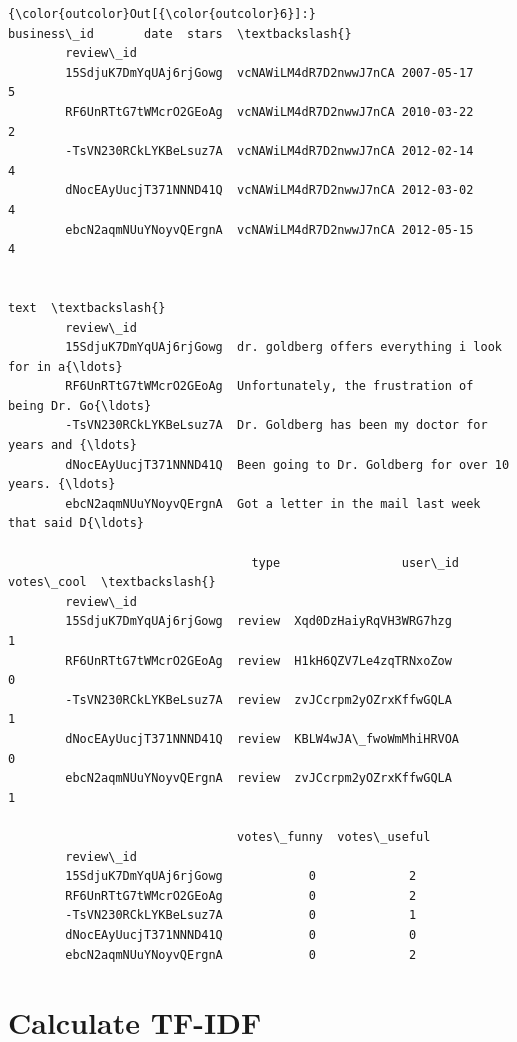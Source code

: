 \documentclass[11pt]{article}
\begin{document}
\begin{Verbatim}[commandchars=\\\{\}]
{\color{outcolor}Out[{\color{outcolor}6}]:}                                    business\_id       date  stars  \textbackslash{}
        review\_id                                                          
        15SdjuK7DmYqUAj6rjGowg  vcNAWiLM4dR7D2nwwJ7nCA 2007-05-17      5   
        RF6UnRTtG7tWMcrO2GEoAg  vcNAWiLM4dR7D2nwwJ7nCA 2010-03-22      2   
        -TsVN230RCkLYKBeLsuz7A  vcNAWiLM4dR7D2nwwJ7nCA 2012-02-14      4   
        dNocEAyUucjT371NNND41Q  vcNAWiLM4dR7D2nwwJ7nCA 2012-03-02      4   
        ebcN2aqmNUuYNoyvQErgnA  vcNAWiLM4dR7D2nwwJ7nCA 2012-05-15      4   
        
                                                                             text  \textbackslash{}
        review\_id                                                                   
        15SdjuK7DmYqUAj6rjGowg  dr. goldberg offers everything i look for in a{\ldots}   
        RF6UnRTtG7tWMcrO2GEoAg  Unfortunately, the frustration of being Dr. Go{\ldots}   
        -TsVN230RCkLYKBeLsuz7A  Dr. Goldberg has been my doctor for years and {\ldots}   
        dNocEAyUucjT371NNND41Q  Been going to Dr. Goldberg for over 10 years. {\ldots}   
        ebcN2aqmNUuYNoyvQErgnA  Got a letter in the mail last week that said D{\ldots}   
        
                                  type                 user\_id  votes\_cool  \textbackslash{}
        review\_id                                                            
        15SdjuK7DmYqUAj6rjGowg  review  Xqd0DzHaiyRqVH3WRG7hzg           1   
        RF6UnRTtG7tWMcrO2GEoAg  review  H1kH6QZV7Le4zqTRNxoZow           0   
        -TsVN230RCkLYKBeLsuz7A  review  zvJCcrpm2yOZrxKffwGQLA           1   
        dNocEAyUucjT371NNND41Q  review  KBLW4wJA\_fwoWmMhiHRVOA           0   
        ebcN2aqmNUuYNoyvQErgnA  review  zvJCcrpm2yOZrxKffwGQLA           1   
        
                                votes\_funny  votes\_useful  
        review\_id                                          
        15SdjuK7DmYqUAj6rjGowg            0             2  
        RF6UnRTtG7tWMcrO2GEoAg            0             2  
        -TsVN230RCkLYKBeLsuz7A            0             1  
        dNocEAyUucjT371NNND41Q            0             0  
        ebcN2aqmNUuYNoyvQErgnA            0             2  
\end{Verbatim}
            
    \hypertarget{calculate-tf-idf}{%
\section{Calculate TF-IDF}\label{calculate-tf-idf}}
\end{document}

